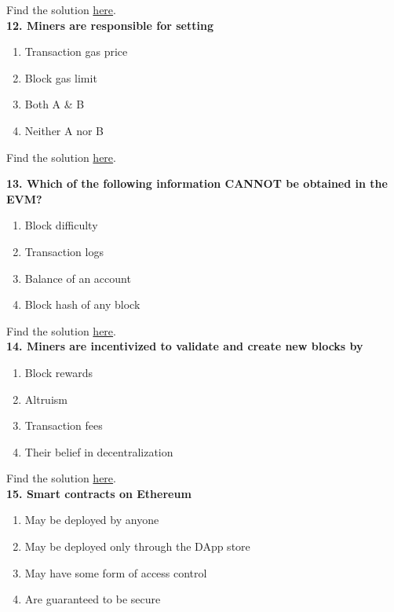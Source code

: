 Find the solution \hyperref[sec:exam1_q11]{here}.\\

\textbf{12. Miners are responsible for setting}

\begin{enumerate}[label=\Alph*.]
    \item Transaction gas price
    \item Block gas limit
    \item Both A \& B
    \item Neither A nor B
\end{enumerate}

Find the solution \hyperref[sec:exam1_q12]{here}.\\

\pagebreak

\textbf{13. Which of the following information CANNOT be obtained in the EVM?}

\begin{enumerate}[label=\Alph*.]
    \item Block difficulty
    \item Transaction logs
    \item Balance of an account
    \item Block hash of any block
\end{enumerate}

Find the solution \hyperref[sec:exam1_q13]{here}.\\

\textbf{14. Miners are incentivized to validate and create new blocks by}

\begin{enumerate}[label=\Alph*.]
    \item Block rewards
    \item Altruism
    \item Transaction fees
    \item Their belief in decentralization
\end{enumerate}

Find the solution \hyperref[sec:exam1_q14]{here}.\\

\textbf{15. Smart contracts on Ethereum}

\begin{enumerate}[label=\Alph*.]
    \item May be deployed by anyone
    \item May be deployed only through the DApp store
    \item May have some form of access control
    \item Are guaranteed to be secure
\end{enumerate}

